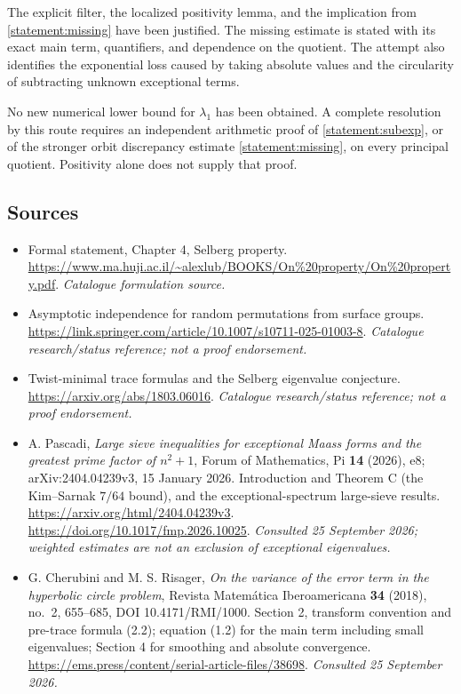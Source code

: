\documentclass[11pt]{article}
\begin{document}
The explicit filter, the localized positivity lemma, and the implication
from \eqref{statement:missing} have been justified. The missing estimate is stated
with its exact main term, quantifiers, and dependence on the quotient. The
attempt also identifies the exponential loss caused by taking absolute values
and the circularity of subtracting unknown exceptional terms.

No new numerical lower bound for $\lambda_1$ has been obtained. A complete
resolution by this route requires an independent arithmetic proof of
\eqref{statement:subexp}, or of the stronger orbit discrepancy estimate
\eqref{statement:missing}, on every principal quotient. Positivity alone does not
supply that proof.

\subsection{Sources}
\begin{itemize}\raggedright
\item[\textnormal{[S1]}]\hypertarget{source:statement:1}{} Formal statement, Chapter 4, Selberg property.
\url{https://www.ma.huji.ac.il/~alexlub/BOOKS/On%20property/On%20property.pdf}.
{\small\textit{Catalogue formulation source.}}
\item[\textnormal{[S2]}]\hypertarget{source:statement:2}{} Asymptotic independence for random permutations from surface groups.
\url{https://link.springer.com/article/10.1007/s10711-025-01003-8}.
{\small\textit{Catalogue research/status reference; not a proof endorsement.}}
\item[\textnormal{[S3]}]\hypertarget{source:statement:3}{} Twist-minimal trace formulas and the Selberg eigenvalue conjecture.
\url{https://arxiv.org/abs/1803.06016}.
{\small\textit{Catalogue research/status reference; not a proof endorsement.}}
\item[\textnormal{[E1]}]\hypertarget{extra:statement:1}{}
A. Pascadi, \emph{Large sieve inequalities for exceptional Maass forms and
the greatest prime factor of $n^2+1$}, Forum of Mathematics, Pi \textbf{14}
(2026), e8; arXiv:2404.04239v3, 15 January 2026. Introduction and Theorem C
(the Kim--Sarnak $7/64$ bound), and the exceptional-spectrum large-sieve
results. \url{https://arxiv.org/html/2404.04239v3}.
\url{https://doi.org/10.1017/fmp.2026.10025}.
{\small\textit{Consulted 25 September 2026; weighted estimates are not an
exclusion of exceptional eigenvalues.}}
\item[\textnormal{[E2]}]\hypertarget{extra:statement:2}{}
G. Cherubini and M. S. Risager, \emph{On the variance of the error term in
the hyperbolic circle problem}, Revista Matem\'atica Iberoamericana
\textbf{34} (2018), no.~2, 655--685, DOI 10.4171/RMI/1000.
Section 2, transform convention and pre-trace formula (2.2); equation (1.2)
for the main term including small eigenvalues; Section 4 for smoothing and
absolute convergence.
\url{https://ems.press/content/serial-article-files/38698}.
{\small\textit{Consulted 25 September 2026.}}
\end{itemize}
\end{document}
